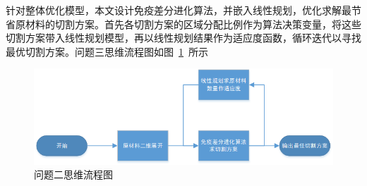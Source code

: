 \documentclass{whutmod}
\begin{document}
        针对整体优化模型，本文设计免疫差分进化算法，并嵌入线性规划，优化求解最节省原材料的切割方案。首先各切割方案的区域分配比例作为算法决策变量，将这些切割方案带入线性规划模型，再以线性规划结果作为适应度函数，循环迭代以寻找最优切割方案。问题三思维流程图如图~\ref{asdasf}~所示	
        \begin{figure}[H]
        	\centering
        	\includegraphics[width=.8\textwidth]{figures/3liu.png}
        	\caption{问题二思维流程图}\label{asdasf}
        \end{figure}
    
\end{document}
